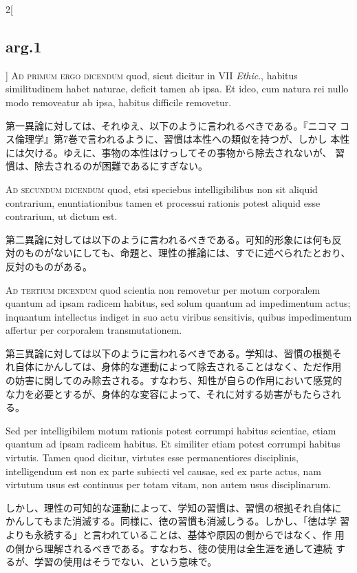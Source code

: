\documentclass[paper=a4paper,fontsize=10pt,jafontsize=9pt,titlepage]{jlreq}
\begin{document}
\begin{paracol}{2}[\subsection{arg.1}]
{\scshape Ad primum ergo dicendum} quod, sicut dicitur in VII
{\itshape Ethic}., habitus similitudinem habet naturae, deficit tamen
ab ipsa. Et ideo, cum natura rei nullo modo removeatur ab ipsa,
habitus difficile removetur.

\switchcolumn

第一異論に対しては、それゆえ、以下のように言われるべきである。『ニコマ
コス倫理学』第7巻で言われるように、習慣は本性への類似を持つが、しかし
本性には欠ける。ゆえに、事物の本性はけっしてその事物から除去されないが、
習慣は、除去されるのが困難であるにすぎない。

\switchcolumn*[\subsection{ad.2}]

{\scshape Ad secundum dicendum} quod, etsi speciebus intelligibilibus
non sit aliquid contrarium, enuntiationibus tamen et processui
rationis potest aliquid esse contrarium, ut dictum est.

\switchcolumn

第二異論に対しては以下のように言われるべきである。可知的形象には何も反
対のものがないにしても、命題と、理性の推論には、すでに述べられたとおり、
反対のものがある。

\switchcolumn*[\subsection{ad.3}]

{\scshape Ad tertium dicendum} quod scientia non removetur per motum
corporalem quantum ad ipsam radicem habitus, sed solum quantum ad
impedimentum actus; inquantum intellectus indiget in suo actu viribus
sensitivis, quibus impedimentum affertur per corporalem
transmutationem.

\switchcolumn

第三異論に対しては以下のように言われるべきである。学知は、習慣の根拠そ
れ自体にかんしては、身体的な運動によって除去されることはなく、ただ作用
の妨害に関してのみ除去される。すなわち、知性が自らの作用において感覚的
な力を必要とするが、身体的な変容によって、それに対する妨害がもたらされ
る。

\switchcolumn*

Sed per intelligibilem motum rationis potest corrumpi habitus
scientiae, etiam quantum ad ipsam radicem habitus. Et similiter etiam
potest corrumpi habitus virtutis. Tamen quod dicitur, virtutes esse
permanentiores disciplinis, intelligendum est non ex parte subiecti
vel causae, sed ex parte actus, nam virtutum usus est continuus per
totam vitam, non autem usus disciplinarum.

\switchcolumn

しかし、理性の可知的な運動によって、学知の習慣は、習慣の根拠それ自体に
かんしてもまた消滅する。同様に、徳の習慣も消滅しうる。しかし、「徳は学
習よりも永続する」と言われていることは、基体や原因の側からではなく、作
用の側から理解されるべきである。すなわち、徳の使用は全生涯を通して連続
するが、学習の使用はそうでない、という意味で。

\end{paracol}
\end{document}
